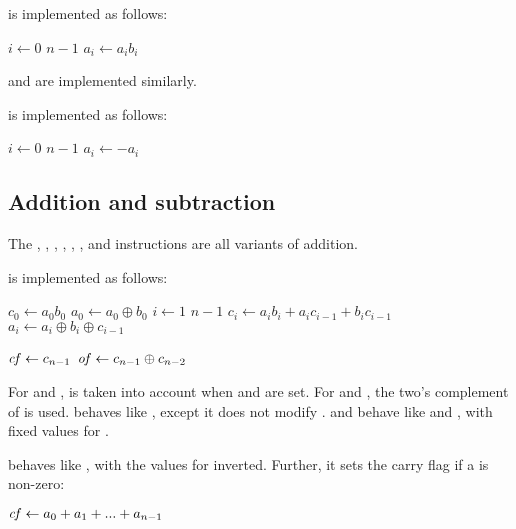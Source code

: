 \documentclass[a4paper,11pt]{kth-mag}
\renewcommand{\gets}{\leftarrow}
\newcommand{\AND}{}
\newcommand{\IOR}{+}
\newcommand{\XOR}{\oplus}
\newcommand{\NOT}{-}
\begin{document}
 is implemented as follows:

\begin{codebox}
\zi \For $i \gets 0$ \To $n-1$
\zi \Do
      $a_i \gets a_i \AND b_i$
    \End
\end{codebox}

 and  are implemented similarly.

 is implemented as follows:

\begin{codebox}
\zi \For $i \gets 0$ \To $n-1$
\zi \Do
      $a_i \gets \NOT a_i$
    \End
\end{codebox}

\subsection{Addition and subtraction}

The , , , , , ,  and  instructions are all variants of addition.

 is implemented as follows:

\begin{codebox}
\zi $c_0 \gets a_0 \AND b_0$
\zi $a_0 \gets a_0 \XOR b_0$
\zi \For $i \gets 1$ \To $n-1$
\zi \Do
      $c_i \gets a_i \AND b_i \IOR a_i \AND c_{i-1} \IOR b_i \AND c_{i-1}$
\zi   $a_i \gets a_i \XOR b_i \XOR c_{i-1}$
    \End
\end{codebox}

\begin{codebox}
\zi $\id{cf} \gets c_{n-1}$
\zi $\id{of} \gets c_{n-1} \XOR c_{n-2}$
\end{codebox}

For  and ,  is taken into account when  and  are set.
For  and , the two's complement of  is used.
 behaves like , except it does not modify .
 and  behave like  and , with fixed values for .

 behaves like , with the values for  inverted.
Further, it sets the carry flag if a is non-zero:

\begin{codebox}
\zi $\id{cf} \gets a_0 + a_1 + ... + a_{n-1}$
\end{codebox}
\end{document}
